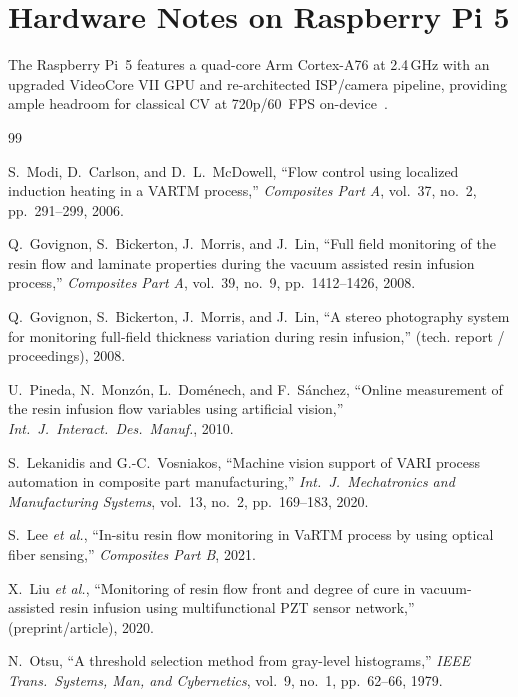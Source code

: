 \documentclass[twocolumn, 10pt]{article}
\begin{document}
\section{Hardware Notes on Raspberry Pi 5}
\label{sec:hardware}
The Raspberry Pi~5 features a quad-core Arm Cortex-A76 at 2.4\,GHz with an upgraded VideoCore VII GPU and re-architected ISP/camera pipeline, providing ample headroom for classical CV at 720p/60~FPS on-device~\cite{rpi5brief}.

\balance
\begin{thebibliography}{99}

S.~Modi, D.~Carlson, and D.~L.~McDowell, ``Flow control using localized induction heating in a VARTM process,'' \emph{Composites Part A}, vol.~37, no.~2, pp.~291--299, 2006.

Q.~Govignon, S.~Bickerton, J.~Morris, and J.~Lin, ``Full field monitoring of the resin flow and laminate properties during the vacuum assisted resin infusion process,'' \emph{Composites Part A}, vol.~39, no.~9, pp.~1412--1426, 2008.

Q.~Govignon, S.~Bickerton, J.~Morris, and J.~Lin, ``A stereo photography system for monitoring full-field thickness variation during resin infusion,'' (tech. report / proceedings), 2008.

U.~Pineda, N.~Monzón, L.~Doménech, and F.~Sánchez, ``Online measurement of the resin infusion flow variables using artificial vision,'' \emph{Int.\ J.\ Interact.\ Des.\ Manuf.}, 2010.

S.~Lekanidis and G.-C.~Vosniakos, ``Machine vision support of VARI process automation in composite part manufacturing,'' \emph{Int.\ J.\ Mechatronics and Manufacturing Systems}, vol.~13, no.~2, pp.~169--183, 2020.

S.~Lee \emph{et al.}, ``In-situ resin flow monitoring in VaRTM process by using optical fiber sensing,'' \emph{Composites Part B}, 2021.

X.~Liu \emph{et al.}, ``Monitoring of resin flow front and degree of cure in vacuum-assisted resin infusion using multifunctional PZT sensor network,'' (preprint/article), 2020.

N.~Otsu, ``A threshold selection method from gray-level histograms,'' \emph{IEEE Trans.\ Systems, Man, and Cybernetics}, vol.~9, no.~1, pp.~62--66, 1979.


\end{thebibliography}
\end{document}

